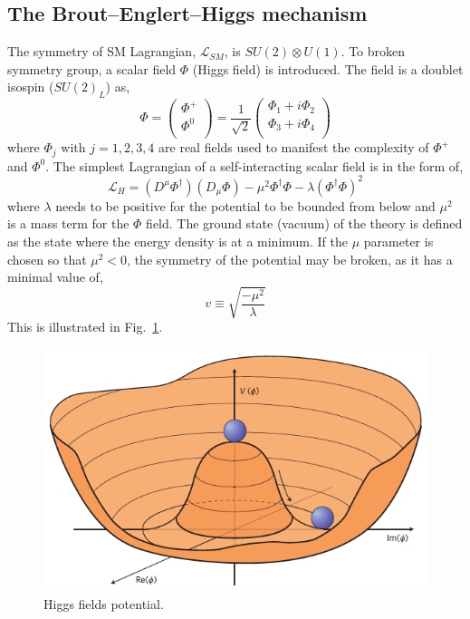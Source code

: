 \subsection*{The Brout–Englert–Higgs mechanism}
The symmetry of SM Lagrangian, $\mathcal{L}_{SM}$, is $SU(2) \otimes U(1)$. To broken symmetry group,  a  scalar field $\Phi$ (Higgs field) is introduced. The field is a doublet isospin ($SU(2)_L$) as,
\newline
$$
\Phi=
\left(
\begin{array}{c}
\Phi^+   \\
\Phi^0 \\
\end{array}
\right)
=\frac{1}{\sqrt{2}}
\left(
\begin{array}{c}
\Phi_1 + i\Phi_2   \\
\Phi_3 + i\Phi_4  \\
\end{array}
\right)
$$
where $\Phi_j$ with $j=1,2,3,4$ are real fields used to manifest the complexity of $\Phi^+$ and  $\Phi^0$. The simplest Lagrangian of a self-interacting scalar field is in the form of,
\begin{equation}
 \mathcal{L}_{H}= (D^{\mu} \Phi^{\dag})(D_{\mu} \Phi) -\mu^2 \Phi^{\dag}\Phi - \lambda(\Phi^{\dag}\Phi)^2 \end{equation}
where $\lambda$ needs to be positive for the potential to be bounded from below and $\mu^2$
 is a mass term for the $\Phi$ field.
The ground state (vacuum) of the theory is defined as the state where the energy density is at a minimum.
If the $\mu$ parameter is chosen so that $\mu^2<0$, the symmetry of the potential may be broken,
as it has a minimal value of,
\newline
$$
v\equiv
\sqrt{\frac{-\mu^2}{\lambda}}
$$
This is illustrated in Fig.~\ref{higgspotential}.

\begin{figure}
\centering
\includegraphics[scale= 0.4]{../Cap1/higgspotential}
\caption{Higgs fields potential.}
\label{higgspotential}
\end{figure}


